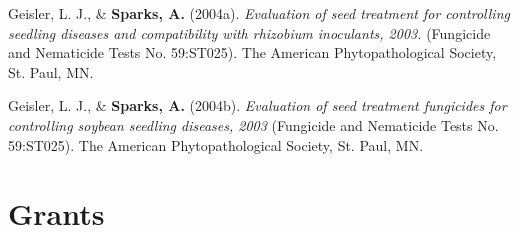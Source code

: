 \documentclass[11pt, a4paper]{awesome-cv}
\begin{document}
\leavevmode\hypertarget{ref-Geisler2004}{}%
Geisler, L. J., \& \textbf{Sparks, A.} (2004a). \emph{Evaluation of seed treatment for controlling seedling diseases and compatibility with rhizobium inoculants, 2003.} (Fungicide and Nematicide Tests No. 59:ST025). The American Phytopathological Society, St. Paul, MN.

\leavevmode\hypertarget{ref-Geisler2004a}{}%
Geisler, L. J., \& \textbf{Sparks, A.} (2004b). \emph{Evaluation of seed treatment fungicides for controlling soybean seedling diseases, 2003} (Fungicide and Nematicide Tests No. 59:ST025). The American Phytopathological Society, St. Paul, MN.

\endgroup

\hypertarget{grants}{%
\section{Grants}\label{grants}}
\end{document}
